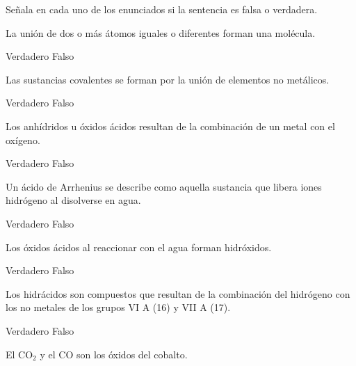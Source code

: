 Señala en cada uno de los enunciados si la sentencia es falsa o verdadera.

\begin{multicols}{2}
    \begin{parts}
        La unión de dos o más átomos
        iguales o diferentes forman
        una molécula.

        \begin{oneparchoices}
            \choice Verdadero
            \choice Falso
        \end{oneparchoices}

        Las sustancias covalentes
        se forman por la unión de
        elementos no metálicos.

        \begin{oneparchoices}
            \choice Verdadero
            \choice Falso
        \end{oneparchoices}

        Los anhídridos u óxidos ácidos resultan de la combinación de un metal con el
        oxígeno.

        \begin{oneparchoices}
            \choice Verdadero
            \choice Falso
        \end{oneparchoices}

        Un ácido de Arrhenius se
        describe como aquella sustancia que libera iones hidrógeno al disolverse en agua.

        \begin{oneparchoices}
            \choice Verdadero
            \choice Falso
        \end{oneparchoices}

        Los óxidos ácidos al reaccionar con el agua forman
        hidróxidos.

        \begin{oneparchoices}
            \choice Verdadero
            \choice Falso
        \end{oneparchoices}

        \columnbreak
        Los hidrácidos son compuestos que resultan de la combinación del hidrógeno con los
        no metales de los grupos VI A
        (16) y VII A (17).

        \begin{oneparchoices}
            \choice Verdadero
            \choice Falso
        \end{oneparchoices}

        El CO$_2$ y el CO son los óxidos del cobalto.


\end{parts}
\end{multicols}
